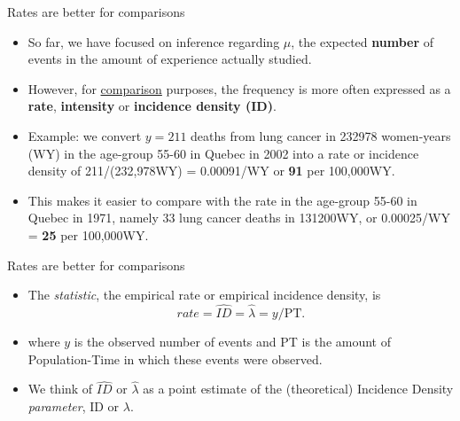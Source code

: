 \documentclass{beamer}\usepackage[]{graphicx}\usepackage[]{color}
\begin{document}
\begin{frame}{Rates are better for comparisons}
\small
\begin{itemize}
	\setlength\itemsep{1em}

	\item So far, we have focused on inference regarding $\mu$, the expected \textbf{number} of events in the amount of experience actually studied. \pause  
	
	\item However, for \underline{comparison} purposes, the frequency is more often expressed as a \textbf{rate}, \textbf{intensity} or \textbf{incidence density (ID)}. \pause 
	
	\item Example: we convert $y=211$ deaths from lung cancer in 232978 women-years (WY) in the age-group 55-60 in Quebec in 2002 into a rate or incidence density of 211/(232,978WY) =  0.00091/WY or \textbf{91} per 100,000WY. \pause 
	
	\item This makes it easier to compare with the rate in the age-group 55-60 in Quebec in 1971, namely 33 lung cancer deaths in 131200WY, or 0.00025/WY = \textbf{25} per 100,000WY.

\end{itemize}
\end{frame} 


\begin{frame}{Rates are better for comparisons}
\begin{itemize}
	\setlength\itemsep{1.5em}
	
	\item The \textit{statistic}, the empirical rate or empirical incidence density, is 
	$$rate =\hat{ID} = \hat{\lambda} = y/\textrm{PT}.$$  
	
	\item where $y$ is the observed number of events and PT is the amount of Population-Time in which these events were observed. 
	
	\item We think of $\hat{ID}$ or $ \hat{\lambda}$ as a  point estimate of the (theoretical) Incidence Density \textit{parameter}, ID or $\lambda$.
\end{itemize}
\end{frame} 
\end{document}
